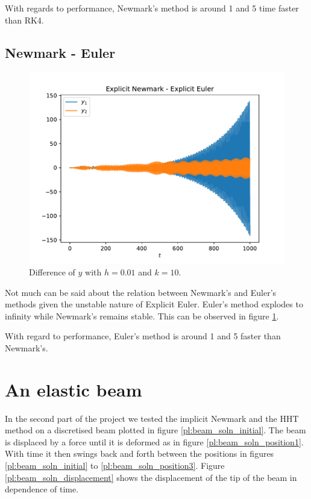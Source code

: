 \documentclass{report}
\begin{document}
With regards to performance, Newmark's method is around 1 and 5 time faster than RK4.

\subsection*{Newmark - Euler}
\begin{figure}
\vspace*{-1cm}
\centering
\begin{minipage}[t]{0.45\textwidth}
\centering
\includegraphics[width=\textwidth]{../Plots/Diff_Proj3/Real/New-Eul_k=1E1_t=1E3_y}
\caption{Difference of $y$ with $h=0.01$ and $k=10$.}
\label{pl:new_eul}
\end{minipage}
\end{figure}
Not much can be said about the relation between Newmark's and Euler's methods given the unstable nature of Explicit Euler. Euler's method explodes to infinity while Newmark's remains stable. This can be observed in figure \ref{pl:new_eul}.


With regard to performance, Euler's method is around 1 and 5 faster than Newmark's.


\section*{An elastic beam}

In the second part of the project we tested the implicit Newmark and the HHT method on a discretised beam plotted in figure \ref{pl:beam_soln_initial}. The beam is displaced by a force until it is deformed as in figure \ref{pl:beam_soln_position1}. With time it then swings back and forth between the positions in figures \ref{pl:beam_soln_initial} to \ref{pl:beam_soln_position3}. Figure \ref{pl:beam_soln_displacement} shows the displacement of the tip of the beam in dependence of time.
\end{document}
